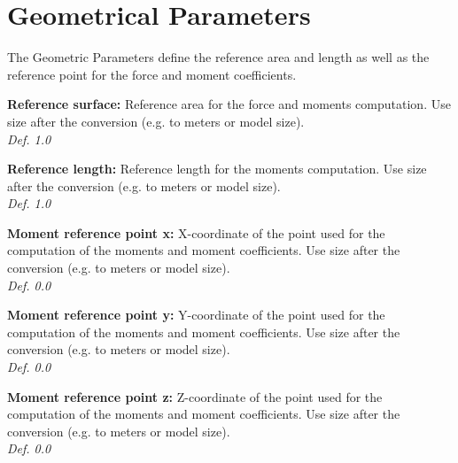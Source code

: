 \documentclass[12pt,epsf,colordvi]{article}
\begin{document}
\section{Geometrical Parameters }
%
The Geometric Parameters define the reference area and length as well as the reference point for the force and moment coefficients.
%
\begin{description}
%
       \item{\bf  Reference surface:}     Reference area for the force and moments computation. Use size after the conversion (e.g. to meters or model size). \\
	    {\it Def.  1.0 }
%
       \item{\bf Reference length:}     Reference length for the moments computation. Use size after the conversion (e.g. to meters or model size).\\
	    {\it Def.  1.0 }
%
       \item{\bf Moment reference point x:}  X-coordinate of the point used for the computation of the moments and moment coefficients. Use size after the conversion (e.g. to meters or model size).\\ {\it Def. 0.0}  
%
       \item{\bf Moment reference point y:} Y-coordinate of the point used for the computation of the moments and moment coefficients. Use size after the conversion (e.g. to meters or model size).\\   {\it Def. 0.0}  
%
       \item{\bf Moment reference point z:} Z-coordinate of the point used for the computation of the moments and moment coefficients. Use size after the conversion (e.g. to meters or model size).\\   {\it Def. 0.0}  
\end{description}      
%
\noindent 
\end{document}
